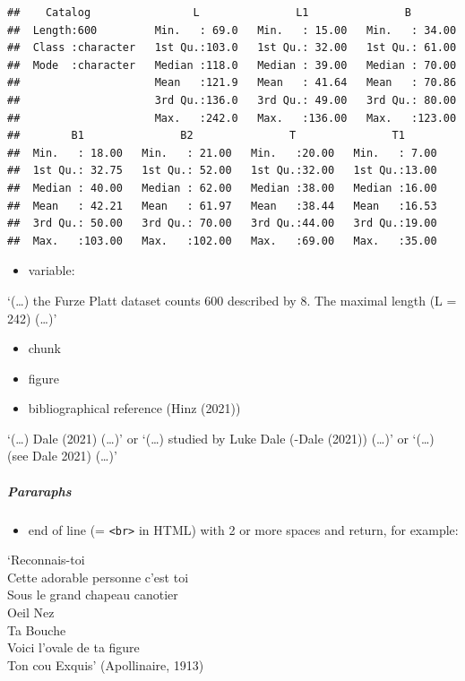 \documentclass[
]{article}
\providecommand{\tightlist}{%
  \setlength{\itemsep}{0pt}\setlength{\parskip}{0pt}}
\begin{document}
\begin{verbatim}
##    Catalog                L               L1               B         
##  Length:600         Min.   : 69.0   Min.   : 15.00   Min.   : 34.00  
##  Class :character   1st Qu.:103.0   1st Qu.: 32.00   1st Qu.: 61.00  
##  Mode  :character   Median :118.0   Median : 39.00   Median : 70.00  
##                     Mean   :121.9   Mean   : 41.64   Mean   : 70.86  
##                     3rd Qu.:136.0   3rd Qu.: 49.00   3rd Qu.: 80.00  
##                     Max.   :242.0   Max.   :136.00   Max.   :123.00  
##        B1               B2               T               T1       
##  Min.   : 18.00   Min.   : 21.00   Min.   :20.00   Min.   : 7.00  
##  1st Qu.: 32.75   1st Qu.: 52.00   1st Qu.:32.00   1st Qu.:13.00  
##  Median : 40.00   Median : 62.00   Median :38.00   Median :16.00  
##  Mean   : 42.21   Mean   : 61.97   Mean   :38.44   Mean   :16.53  
##  3rd Qu.: 50.00   3rd Qu.: 70.00   3rd Qu.:44.00   3rd Qu.:19.00  
##  Max.   :103.00   Max.   :102.00   Max.   :69.00   Max.   :35.00
\end{verbatim}

\begin{itemize}
\tightlist
\item
  variable:
\end{itemize}

`(\ldots) the Furze Platt dataset counts 600 described by 8. The maximal
length (L = 242) (\ldots)'

\begin{itemize}
\item
  chunk
\item
  figure
\item
  bibliographical reference (Hinz (2021))
\end{itemize}

`(\ldots) Dale (2021) (\ldots)' or `(\ldots) studied by Luke Dale (-Dale
(2021)) (\ldots)' or `(\ldots) (see Dale 2021) (\ldots)'

\hypertarget{pararaphs}{%
\subparagraph{Pararaphs}\label{pararaphs}}

\begin{itemize}
\tightlist
\item
  end of line (= \texttt{\textless{}br\textgreater{}} in HTML) with 2 or
  more spaces and return, for example:
\end{itemize}

`Reconnais-toi\\
Cette adorable personne c'est toi\\
Sous le grand chapeau canotier\\
Oeil Nez\\
Ta Bouche\\
Voici l'ovale de ta figure\\
Ton cou Exquis' (Apollinaire, 1913)
\end{document}
